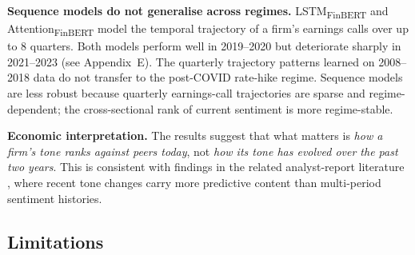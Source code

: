 \textbf{Sequence models do not generalise across regimes.} LSTM\textsubscript{FinBERT} and Attention\textsubscript{FinBERT} model the temporal trajectory of a firm's earnings calls over up to 8 quarters. Both models perform well in 2019--2020 but deteriorate sharply in 2021--2023 (see Appendix~E). The quarterly trajectory patterns learned on 2008--2018 data do not transfer to the post-COVID rate-hike regime. Sequence models are less robust because quarterly earnings-call trajectories are sparse and regime-dependent; the cross-sectional rank of current sentiment is more regime-stable.

\textbf{Economic interpretation.} The results suggest that what matters is \textit{how a firm's tone ranks against peers today}, not \textit{how its tone has evolved over the past two years}. This is consistent with findings in the related analyst-report literature \cite{huang2023}, where recent tone changes carry more predictive content than multi-period sentiment histories.

\subsection{Limitations}

